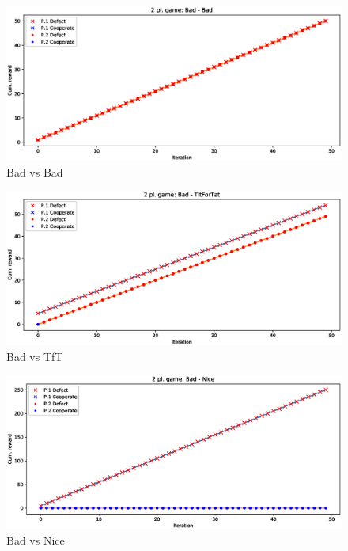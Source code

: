 \documentclass[journal,a4paper,10pt,twoside]{IEEEtran} %
\begin{document}
\begin{figure}[!ht]
    \centering
    \includegraphics[width=1\columnwidth]{../img/ipd2p/ipd2p-rewards-Bad-Bad}
    \caption{Bad vs Bad}
    \label{fig:badvsbad}
\end{figure}

\begin{figure}[!ht]
    \centering
    \includegraphics[width=1\columnwidth]{../img/ipd2p/ipd2p-rewards-Bad-TitForTat}
    \caption{Bad vs TfT}
    \label{fig:badvstft}
\end{figure}

\begin{figure}[!ht]
    \centering
    \includegraphics[width=1\columnwidth]{../img/ipd2p/ipd2p-rewards-Bad-Nice}
    \caption{Bad vs Nice}
    \label{fig:badvsnice}
\end{figure}
\end{document}
